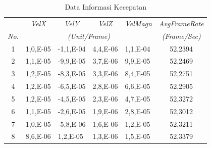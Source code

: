 \begin{table}[]
\caption{Data Informasi Kecepatan}
\label{tb:4_2}
\begin{tabular}{|c|l|l|l|l|c|}
\hline
                               & \multicolumn{1}{c|}{\textit{VelX}} & \multicolumn{1}{c|}{\textit{VelY}} & \multicolumn{1}{c|}{\textit{VelZ}} & \multicolumn{1}{c|}{\textit{VelMagn}} & \textit{AvgFrameRate}          \\ \cline{2-6} 
\multirow{-2}{*}{\textit{No.}} & \multicolumn{4}{c|}{\textit{(Unit/Frame)}}                                                                                                           & \textit{(Frame/Sec)}           \\ \hline
{\color[HTML]{000000} 1}       & {\color[HTML]{000000} 1,0,E-05}    & {\color[HTML]{000000} -1,1,E-04}   & {\color[HTML]{000000} 4,4,E-06}    & {\color[HTML]{000000} 1,1,E-04}       & {\color[HTML]{000000} 52,2394} \\ \hline
{\color[HTML]{000000} 2}       & {\color[HTML]{000000} 1,1,E-05}    & {\color[HTML]{000000} -9,9,E-05}   & {\color[HTML]{000000} 3,7,E-06}    & {\color[HTML]{000000} 9,9,E-05}       & {\color[HTML]{000000} 52,2469} \\ \hline
{\color[HTML]{000000} 3}       & {\color[HTML]{000000} 1,2,E-05}    & {\color[HTML]{000000} -8,3,E-05}   & {\color[HTML]{000000} 3,3,E-06}    & {\color[HTML]{000000} 8,4,E-05}       & {\color[HTML]{000000} 52,2751} \\ \hline
{\color[HTML]{000000} 4}       & {\color[HTML]{000000} 1,2,E-05}    & {\color[HTML]{000000} -6,5,E-05}   & {\color[HTML]{000000} 2,8,E-06}    & {\color[HTML]{000000} 6,6,E-05}       & {\color[HTML]{000000} 52,2905} \\ \hline
{\color[HTML]{000000} 5}       & {\color[HTML]{000000} 1,2,E-05}    & {\color[HTML]{000000} -4,5,E-05}   & {\color[HTML]{000000} 2,3,E-06}    & {\color[HTML]{000000} 4,7,E-05}       & {\color[HTML]{000000} 52,3272} \\ \hline
{\color[HTML]{000000} 6}       & {\color[HTML]{000000} 1,1,E-05}    & {\color[HTML]{000000} -2,6,E-05}   & {\color[HTML]{000000} 1,9,E-06}    & {\color[HTML]{000000} 2,8,E-05}       & {\color[HTML]{000000} 52,3012} \\ \hline
{\color[HTML]{000000} 7}       & {\color[HTML]{000000} 1,0,E-05}    & {\color[HTML]{000000} -5,8,E-06}   & {\color[HTML]{000000} 1,6,E-06}    & {\color[HTML]{000000} 1,2,E-05}       & {\color[HTML]{000000} 52,3211} \\ \hline
{\color[HTML]{000000} 8}       & {\color[HTML]{000000} 8,6,E-06}    & {\color[HTML]{000000} 1,2,E-05}    & {\color[HTML]{000000} 1,3,E-06}    & {\color[HTML]{000000} 1,5,E-05}       & {\color[HTML]{000000} 52,3379} \\ \hline

\end{tabular}
\end{table}
